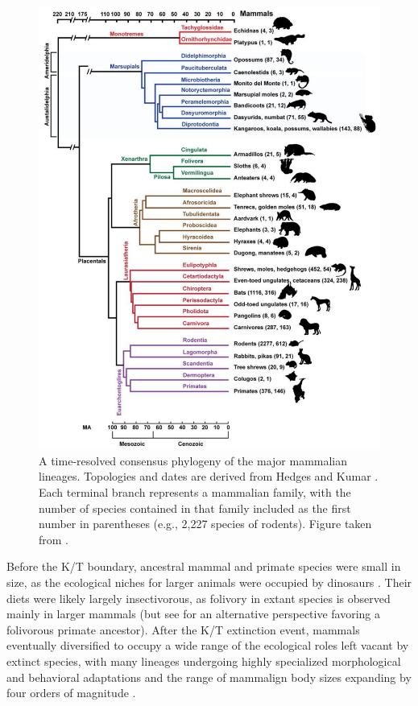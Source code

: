 \begin{figure}
\centering
\includegraphics[scale=0.5]{Figs/mammals_10k.pdf}
\caption{A time-resolved consensus phylogeny of the major mammalian
  lineages. Topologies and dates are derived from Hedges and Kumar
  \citeyearpar{Hedges2009}. Each terminal branch represents a
  mammalian family, with the number of species contained in that
  family included as the first number in parentheses (e.g., 2,227
  species of rodents). Figure taken from \citet{Haussler2009}. }
\label{fig_mammals_10k}
\end{figure}

Before the K/T boundary, ancestral mammal and primate species were
small in size, as the ecological niches for larger animals were
occupied by dinosaurs \citep{Martin2008,Smith2010}. Their diets were
likely largely insectivorous, as folivory in extant species is
observed mainly in larger mammals \citep{Smith2010} (but see
\citet{Martin2007} for an alternative perspective favoring a
folivorous primate ancestor). After the K/T extinction event, mammals
eventually diversified to occupy a wide range of the ecological roles
left vacant by extinct species, with many lineages undergoing highly
specialized morphological and behavioral adaptations and the range of
mammalign body sizes expanding by four orders of magnitude
\citep{Alroy1998}. 

